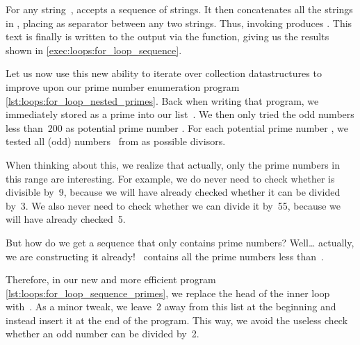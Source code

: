 For any string~,  accepts a sequence  of strings.
It then concatenates all the strings in , placing  as separator between any two strings.
Thus, invoking  produces .
This text is finally is written to the output via the  function, giving us the results shown in  \cref{exec:loops:for_loop_sequence}.

%

Let us now use this new ability to iterate over collection datastructures to improve upon our prime number enumeration program \cref{lst:loops:for_loop_nested_primes}.
Back when writing that program, we immediately stored  as a prime into our list~.
We then only tried the odd numbers less than~200 as potential prime number .
For each potential prime number , we tested all (odd) numbers~ from  as possible divisors.

When thinking about this, we realize that actually, only the prime numbers in this range are interesting.
For example, we do never need to check whether  is divisible by~9, because we will have already checked whether it can be divided by~3.
We also never need to check whether we can divide it by~55, because we will have already checked~5.

But how do we get a sequence that only contains prime numbers?
Well{\dots} actually, we are constructing it already!
~contains all the prime numbers less than~.

Therefore, in our new and more efficient program \cref{lst:loops:for_loop_sequence_primes}, we replace the head of the inner loop with~.
As a minor tweak, we leave~2 away from this list at the beginning and instead insert it at the end of the program.
This way, we avoid the useless check whether an odd number  can be divided by~2.

